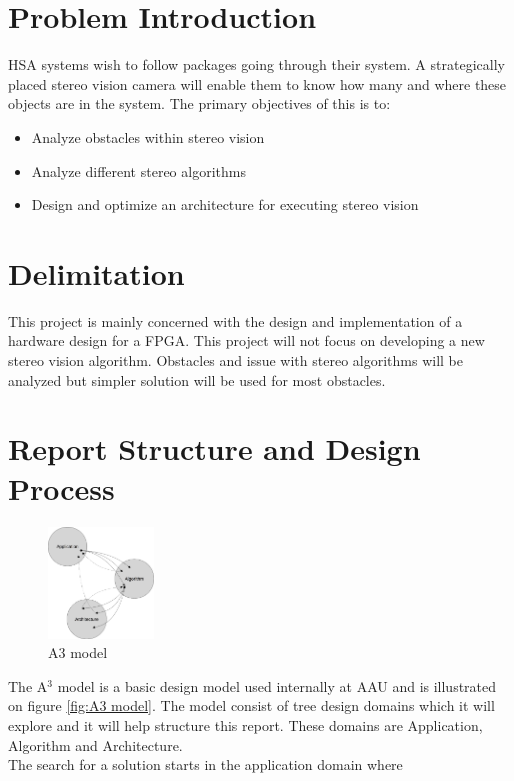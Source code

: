 \section{Problem Introduction}
HSA systems wish to follow packages going through their system. A strategically placed stereo vision camera will enable them to know how many and where these objects are in the system. 
The primary objectives of this is to:
\begin{itemize}
  \item Analyze obstacles within stereo vision
  \item Analyze different stereo algorithms
  \item Design and optimize an architecture for executing stereo vision 
\end{itemize}


\section{Delimitation}
This project is mainly concerned with the design and implementation of a hardware design for a FPGA. This project will not focus on developing a new stereo vision algorithm. Obstacles and issue with stereo algorithms will be analyzed but simpler solution will be used for most obstacles.

\section{Report Structure and Design Process}

\begin{figure}[ht!]
  \centering
  \includegraphics[width=0.25\textwidth]{figures/A3model.jpg}
  \caption{A3 model}
  \label{fig:A3 model}
\end{figure}

The A$^3$ model is a basic design model used internally at AAU and is illustrated on figure \vref{fig:A3 model}. The model consist of tree design domains which it will explore and it will help structure this report. These domains are Application, Algorithm and Architecture.\\
The search for a solution starts in the application domain where \\~\\

